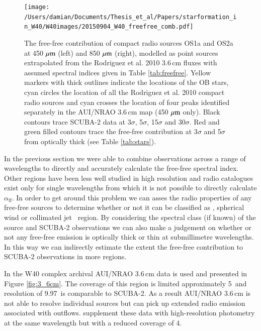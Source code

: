 \begin{figure}
\begin{centering}
\texttt{[image: /Users/damian/Documents/Thesis\_et\_al/Papers/starformation\_in\_W40/W40images/20150904\_W40\_freefree\_comb.pdf]}
\caption{The free-free contribution of compact radio sources OS1a and OS2a at 450\,$\,\mu\rm{m}$ (left) and 850\,$\,\mu\rm{m}$ (right), modelled as point sources extrapolated from the Rodriguez et al. 2010 3.6\,cm fluxes with assumed spectral indices given in Table \ref{tab:freefree}. Yellow markers with thick outlines indicate the locations of the OB stars, cyan circles the location of all the Rodriguez et al. 2010 compact radio sources and cyan crosses the location of four peaks identified separately in the AUI/NRAO 3.6\,cm map (450\,$\,\mu\rm{m}$ only). Black contours trace SCUBA-2 data at 3$\sigma$, 5$\sigma$, 15$\sigma$ and 30$\sigma$. Red and green filled contours trace the free-free contribution at 3$\sigma$ and 5$\sigma$ from optically thick (see Table \ref{tab:stars}).} 
\label{fig:freefree3_6}
\end{centering}
\end{figure} 

In the previous section we were able to combine observations across a range of wavelengths to directly and accurately calculate the free-free spectral index. Other regions have been less well studied in high resolution and radio catalogues exist only for single wavelengths from which it is not possible to directly calculate $\alpha_{\mathrm{ff}}$. In order to get around this problem we can asses the radio properties of any free-free sources to determine whether or not it can be classified as \HII, spherical wind \UCHII or collimated jet \UCHII\ region. By considering the spectral class (if known) of the source and SCUBA-2 observations we can also make a judgement on whether or not any free-free emission is optically thick or thin at submillimetre wavelengths. In this way we can indirectly estimate the extent the free-free contribution to SCUBA-2 observations in more regions.

In the W40 complex 
archival AUI/NRAO 3.6\,cm data is used and presented in Figure \ref{fig:3_6cm}. The coverage of this region is limited approximately 5\arcmin\ and resolution of 9.97\arcsec\ is comparable to SCUBA-2. As a result AUI/NRAO 3.6\,cm is not able to resolve individual sources but can pick up extended radio emission associated with outflows. \cite{Rodriguez:2010bs} supplement these data with high-resolution photometry at the same wavelength but with a reduced coverage of 4\arcmin. 

